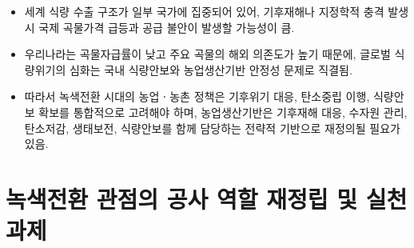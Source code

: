 \begin{itemize}
    \item 세계 식량 수출 구조가 일부 국가에 집중되어 있어, 기후재해나 지정학적 충격 발생 시 국제 곡물가격 급등과 공급 불안이 발생할 가능성이 큼.

    \item 우리나라는 곡물자급률이 낮고 주요 곡물의 해외 의존도가 높기 때문에, 글로벌 식량위기의 심화는 국내 식량안보와 농업생산기반 안정성 문제로 직결됨.

    \item 따라서 녹색전환 시대의 농업ㆍ농촌 정책은 기후위기 대응, 탄소중립 이행, 식량안보 확보를 통합적으로 고려해야 하며, 농업생산기반은 기후재해 대응, 수자원 관리, 탄소저감, 생태보전, 식량안보를 함께 담당하는 전략적 기반으로 재정의될 필요가 있음.
\end{itemize}


\section{녹색전환 관점의 공사 역할 재정립 및 실천과제}

